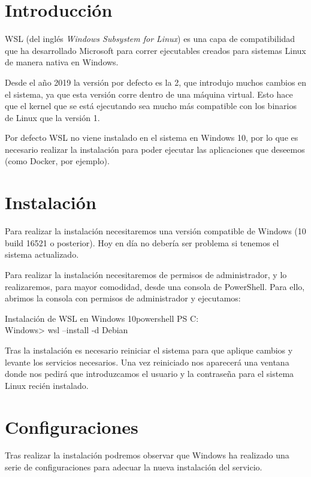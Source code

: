 \chapter{Introducción}

WSL (del inglés \textit{Windows Subsystem for Linux}) es una capa de compatibilidad que ha desarrollado Microsoft para correr ejecutables creados para sistemas Linux de manera nativa en Windows.

Desde el año 2019 la versión por defecto es la 2, que introdujo muchos cambios en el sistema, ya que esta versión corre dentro de una máquina virtual. Esto hace que el kernel que se está ejecutando sea mucho más compatible con los binarios de Linux que la versión 1.

Por defecto WSL no viene instalado en el sistema en Windows 10, por lo que es necesario realizar la instalación para poder ejecutar las aplicaciones que deseemos (como Docker, por ejemplo).

\chapter{Instalación}

Para realizar la instalación necesitaremos una versión compatible de Windows (10 build 16521 o posterior). Hoy en día no debería ser problema si tenemos el sistema actualizado.

Para realizar la instalación necesitaremos de permisos de administrador, y lo realizaremos, para mayor comodidad, desde una consola de PowerShell. Para ello, abrimos la consola con permisos de administrador y ejecutamos:

\begin{mycode}{Instalación de WSL en Windows 10}{powershell}{}
PS C:\\Windows{}> wsl --install -d Debian
\end{mycode}

Tras la instalación es necesario reiniciar el sistema para que aplique cambios y levante los servicios necesarios. Una vez reiniciado nos aparecerá una ventana donde nos pedirá que introduzcamos el usuario y la contraseña para el sistema Linux recién instalado.

\chapter{Configuraciones}

Tras realizar la instalación podremos observar que Windows ha realizado una serie de configuraciones para adecuar la nueva instalación del servicio.

